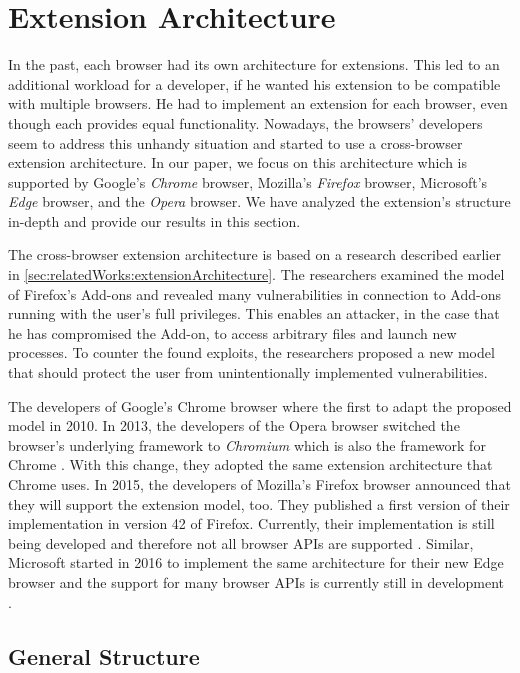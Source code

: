 \newpage
\section{Extension Architecture}
\label{sec:extensionArchitecture}

	In the past, each browser had its own architecture for extensions. This led to an additional workload for a developer, if he wanted his extension to be compatible with multiple browsers. He had to implement an extension for each browser, even though each provides equal functionality. Nowadays, the browsers' developers seem to address this unhandy situation and started to use a cross-browser extension architecture. In our paper, we focus on this architecture which is supported by Google's \textit{Chrome} browser, Mozilla's \textit{Firefox} browser, Microsoft's \textit{Edge} browser, and the \textit{Opera} browser. We have analyzed the extension's structure in-depth and provide our results in this section.

	The cross-browser extension architecture is based on a research described earlier in \autoref{sec:relatedWorks:extensionArchitecture}. The researchers examined the model of Firefox's Add-ons and revealed many vulnerabilities in connection to Add-ons running with the user's full privileges. This enables an attacker, in the case that he has compromised the Add-on, to access arbitrary files and launch new processes. To counter the found exploits, the researchers proposed a new model that should protect the user from unintentionally implemented vulnerabilities.

	The developers of Google's Chrome browser where the first to adapt the proposed model in 2010. In 2013, the developers of the Opera browser switched the browser's underlying framework to \textit{Chromium} which is also the framework for Chrome \cite{operaBlogSwitchToChromium}. With this change, they adopted the same extension architecture that Chrome uses. In 2015, the developers of Mozilla's Firefox browser announced that they will support the extension model, too. They published a first version of their implementation in version 42 of Firefox. Currently, their implementation is still being developed and therefore not all browser APIs are supported \cite{mozillaWebExtensionStatus}. Similar, Microsoft started in 2016 to implement the same architecture for their new Edge browser and the support for many browser APIs is currently still in development \cite{edgeBrowserApiStatus}.

\subsection{General Structure}

